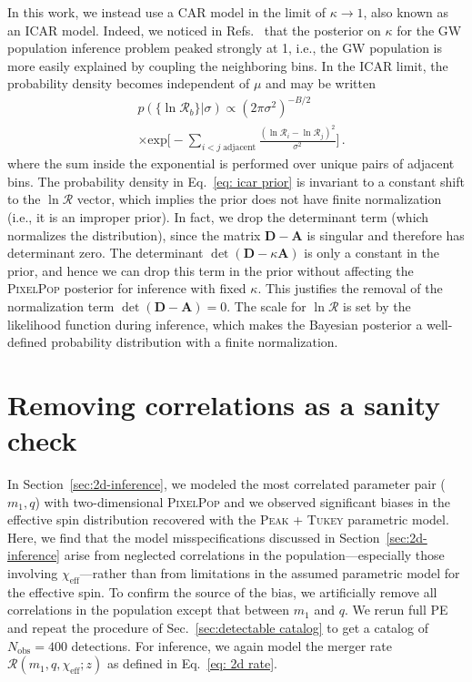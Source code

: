 \documentclass[twocolumn, twocolappendix]{aastex631}
\newcommand{\chieff}{\ensuremath{\chi_\mathrm{eff}}}
\newcommand{\PixelPop}{\textsc{PixelPop}\xspace}
\newcommand{\PeakTukey}{\textsc{Peak + Tukey}\xspace}
\begin{document}
In this work, we instead use a \ac{CAR} model in the limit of $\kappa \to 1$, also known as an \ac{ICAR} model. Indeed, we noticed in Refs.~\citep{Heinzel:2024hva,Heinzel:2024jlc} that the posterior on $\kappa$ for the \ac{GW} population inference problem peaked strongly at 1, i.e., the \ac{GW} population is more easily explained by coupling the neighboring bins. In the \ac{ICAR} limit, the probability density becomes independent of $\mu$ and may be written
\begin{align}
& p ( \{ \ln\mathcal{R}_b \} | \sigma )
\propto
(2\pi \sigma^2 )^{-B/2}
\nonumber \\
& \times
\mathrm{exp}
\bigg[
- \sum_{i<j \; \textrm{adjacent}}
\frac{(\ln\mathcal{R}_i -\ln\mathcal{R}_j)^2}{\sigma^2}
\bigg]
\, .
\label{eq: icar prior}    
\end{align}
where the sum inside the exponential is performed over unique pairs of adjacent bins. The probability density in Eq.~\eqref{eq: icar prior} is invariant to a constant shift to the $\ln\boldsymbol{\mathcal{R}}$ vector, which implies the prior does not have finite normalization (i.e., it is an improper prior). In fact, we drop the determinant term (which normalizes the distribution), since the matrix $\mathbf{D}-\mathbf{A}$ is singular and therefore has determinant zero. The determinant $\det(\mathbf{D} - \kappa\mathbf{A})$ is only a constant in the prior, and hence we can drop this term in the prior without affecting the \PixelPop posterior for inference with fixed $\kappa$. This justifies the removal of the normalization term $\det(\mathbf{D} - \mathbf{A}) = 0$. The scale for $\ln\boldsymbol{\mathcal{R}}$ is set by the likelihood function during inference, which makes the Bayesian posterior a well-defined probability distribution with a finite normalization.


\section{Removing correlations as a sanity check}
\label{sec:appUncorrPop}

In Section~\ref{sec:2d-inference}, we modeled the most correlated parameter pair ($m_1,q$) with two-dimensional \PixelPop and we observed significant biases in the effective spin distribution recovered with the \PeakTukey parametric model. Here, we find that the model misspecifications discussed in Section~\ref{sec:2d-inference} arise from neglected correlations in the population---especially those involving $\chieff$---rather than from limitations in the assumed parametric model for the effective spin. To confirm the source of the bias, we artificially remove all correlations in the population except that between $m_1$ and $q$. We rerun full \ac{PE} and repeat the procedure of Sec.~\ref{sec:detectable catalog} to get a catalog of $N_\mathrm{obs} = 400$ detections. For inference, we again model the merger rate $\mathcal{R}(m_1,q,\chieff;z)$ as defined in Eq.~\eqref{eq: 2d rate}. 
\end{document}
